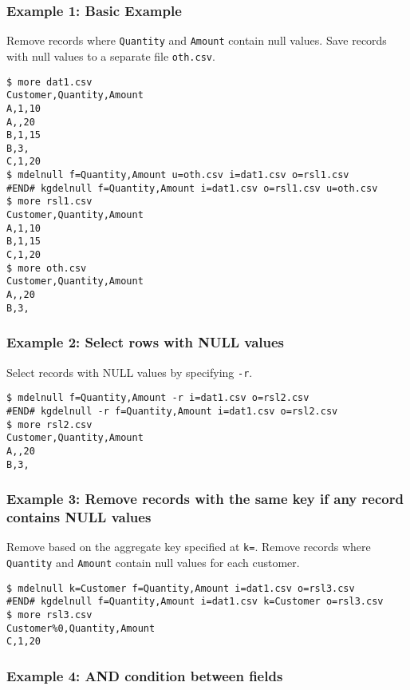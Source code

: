 \subsubsection*{Example 1: Basic Example}

Remove records where \verb|Quantity| and \verb|Amount| contain null values. Save records with null values to a separate file \verb|oth.csv|.


\begin{Verbatim}[baselinestretch=0.7,frame=single]
$ more dat1.csv
Customer,Quantity,Amount
A,1,10
A,,20
B,1,15
B,3,
C,1,20
$ mdelnull f=Quantity,Amount u=oth.csv i=dat1.csv o=rsl1.csv
#END# kgdelnull f=Quantity,Amount i=dat1.csv o=rsl1.csv u=oth.csv
$ more rsl1.csv
Customer,Quantity,Amount
A,1,10
B,1,15
C,1,20
$ more oth.csv
Customer,Quantity,Amount
A,,20
B,3,
\end{Verbatim}
\subsubsection*{Example 2: Select rows with NULL values}

Select records with NULL values by specifying \verb|-r|.


\begin{Verbatim}[baselinestretch=0.7,frame=single]
$ mdelnull f=Quantity,Amount -r i=dat1.csv o=rsl2.csv
#END# kgdelnull -r f=Quantity,Amount i=dat1.csv o=rsl2.csv
$ more rsl2.csv
Customer,Quantity,Amount
A,,20
B,3,
\end{Verbatim}
\subsubsection*{Example 3: Remove records with the same key if any record contains NULL values}

Remove based on the aggregate key specified at \verb|k=|.
Remove records where \verb|Quantity| and \verb|Amount| contain null values for each customer.


\begin{Verbatim}[baselinestretch=0.7,frame=single]
$ mdelnull k=Customer f=Quantity,Amount i=dat1.csv o=rsl3.csv
#END# kgdelnull f=Quantity,Amount i=dat1.csv k=Customer o=rsl3.csv
$ more rsl3.csv
Customer%0,Quantity,Amount
C,1,20
\end{Verbatim}
\subsubsection*{Example 4: AND condition between fields}

